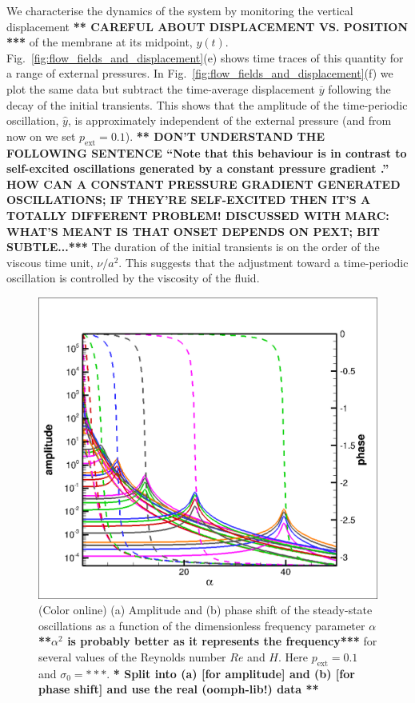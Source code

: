 \documentclass[aps,prl,reprint,superscriptaddress,floatfix]{revtex4-1}
\begin{document}
We characterise the dynamics of the system by monitoring the vertical
displacement {\bf *** CAREFUL ABOUT DISPLACEMENT VS. POSITION ***}
of the membrane at its midpoint, $y(t)$. 
Fig.~\ref{fig:flow_fields_and_displacement}(e) shows time traces of this 
quantity for a range of external pressures. In
Fig.~\ref{fig:flow_fields_and_displacement}(f) we plot
the same data but subtract the time-average displacement
$\overline{y}$ following the decay of the initial transients. This shows
that the amplitude of the time-periodic oscillation, $\widehat{y}$,
is approximately independent of the external pressure (and from now on we set
$p_\text{ext}=0.1$).
{\bf *** DON'T UNDERSTAND THE FOLLOWING SENTENCE ``Note that this
behaviour is in contrast to self-excited oscillations generated by a
constant pressure gradient \cite{Tang15}.'' HOW CAN A CONSTANT
PRESSURE
GRADIENT GENERATED OSCILLATIONS; IF THEY'RE SELF-EXCITED THEN IT'S
A TOTALLY DIFFERENT PROBLEM! DISCUSSED WITH MARC: WHAT'S MEANT IS THAT
ONSET DEPENDS ON PEXT; BIT SUBTLE...***}
The duration of the initial transients is on the order of the
viscous time unit, $\nu/a^2$. This suggests
that the adjustment toward a time-periodic oscillation is 
controlled by the viscosity of the fluid.

\begin{figure}
\centering
\includegraphics[width=1.0\linewidth]{maple/all_sigma0_times_H.png}	
\caption{\label{fig:amplitude_phase}(Color online) (a) Amplitude and
  (b) phase shift of the steady-state oscillations as a function of
  the dimensionless frequency parameter $\alpha$ {\bf ***$\alpha^2$ is
  probably better as it represents the frequency***} for several
  values of the Reynolds number $Re$ and $H$.
  Here $p_\text{ext}=0.1$ and $\sigma_0=***$.
  {\bf ** Split into (a) [for amplitude] and (b) [for phase shift]
    and use the real (oomph-lib!) data **}
}
\end{figure}
\end{document}
